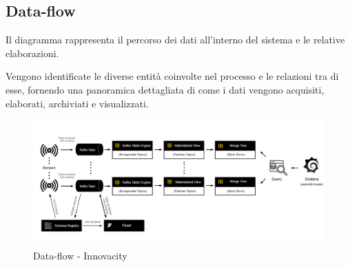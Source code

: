 \subsection{Data-flow}
Il diagramma rappresenta il percorso dei dati all'interno del sistema e le relative elaborazioni.

Vengono identificate le diverse entità coinvolte nel processo e le relazioni tra di esse, fornendo una panoramica dettagliata di come i dati vengono acquisiti, elaborati, archiviati e visualizzati.
\begin{figure}[H]
    \centering
    \includegraphics[width=1\textwidth]{../Images/SpecificaTecnica/data_flow.jpg}
    \caption{Data-flow - Innovacity}
    \label{fig: dataflow}
\end{figure}


